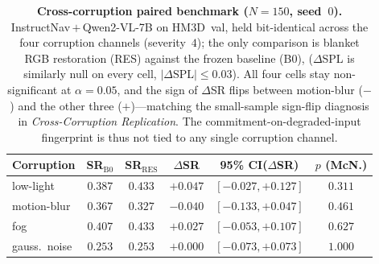 \begin{table}[t]
\centering
\footnotesize
\setlength{\tabcolsep}{2.3pt}
\begin{tabular}{@{}lccccc@{}}
\toprule
Corruption & SR$_{\text{B0}}$ & SR$_{\text{RES}}$ & $\Delta$SR & 95\% CI($\Delta$SR) & $p$ (McN.) \\
\midrule
low-light & $0.387$ & $0.433$ & $+0.047$ & $[-0.027,+0.127]$ & $0.311$ \\
motion-blur & $0.367$ & $0.327$ & $-0.040$ & $[-0.133,+0.047]$ & $0.461$ \\
fog & $0.407$ & $0.433$ & $+0.027$ & $[-0.053,+0.107]$ & $0.627$ \\
gauss.\ noise & $0.253$ & $0.253$ & $+0.000$ & $[-0.073,+0.073]$ & $1.000$ \\
\bottomrule
\end{tabular}
\caption{\textbf{Cross-corruption paired benchmark ($N{=}150$, seed~$0$).}
InstructNav\,$+$\,Qwen2-VL-7B on HM3D~val, held bit-identical across the
four corruption channels (severity~$4$); the only comparison is blanket
RGB restoration (RES) against the frozen baseline (B0), ($\Delta$SPL is similarly null on every
cell, $|\Delta\text{SPL}|{\leq}0.03$). All four cells stay non-significant at
$\alpha{=}0.05$, and the sign of $\Delta$SR flips between motion-blur
($-$) and the other three ($+$)---matching the small-sample sign-flip
diagnosis in \emph{Cross-Corruption Replication}. The commitment-on-degraded-input
fingerprint is thus not tied to any single corruption channel.}
\label{tab:cross-corruption}
\end{table}
